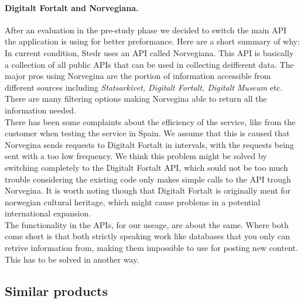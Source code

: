 \paragraph{Digitalt Fortalt and Norvegiana.}
After an evaluation in the pre-study phase we decided to switch the main API the application is using for better preformance. Here are a short summary of why:\\[4pt]

In current condition, Stedr uses an API called Norvegiana. This API is basically a collection of all public APIs that can be used in collecting deifferent data. The major pros using Norvegina are the portion of information accessible from different sources including \emph{Statsarkivet, Digitalt Fortalt, Digitalt Museum} etc. There are many filtering options making Norvegina able to return all the information needed.\\
There has been some complaints about the efficiency of the service, like from the customer when testing the service in Spain. We assume that this is caused that Norvegina sends requests to Digitalt Fortalt in intervals, with the requests being sent with a too low frequency. We think this problem might be solved by switching completely to the Digitalt Fortalt API, which sould not be too much trouble considering the existing code only makes simple calls to the API trough Norvegina. It is worth noting though that Digitalt Fortalt is originally ment for norwegian cultural heritage, which might cause problems in a potential international expansion.\\
The functionality in the APIs, for our useage, are about the same. Where both come short is that both strictly speaking work like databases that you only can retrive information from, making them impossible to use for posting new content. This has to be solved in another way.\\ 


	\subsection{Similar products}
